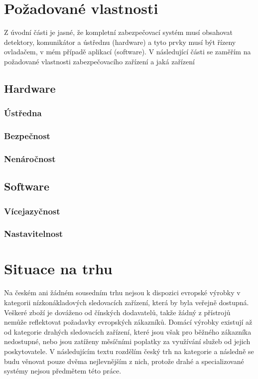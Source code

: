 \documentclass[FM,MP]{tulthesis}  %
\begin{document}

\chapter{Požadované vlastnosti}
Z úvodní části je jasné, že kompletní zabezpečovací systém musí obsahovat detektory, komunikátor a ústřednu (hardware) a tyto prvky musí být řízeny ovladačem, v mém případě aplikací (software). V následující části se zaměřím na požadované vlastnosti zabezpečovacího zařízení a jaká zařízení 

\section{Hardware}

\subsection{Ústředna}


\subsection{Bezpečnost}


\subsection{Nenáročnost}


\section{Software}


\subsection{Vícejazyčnost}


\subsection{Nastavitelnost}



\chapter{Situace na trhu}
Na českém ani žádném sousedním trhu nejsou k dispozici evropské výrobky v kategorii nízkonákladových sledovacích zařízení, která by byla veřejně dostupná. Veškeré zboží je dováženo od čínských dodavatelů, takže žádný z přístrojů nemůže reflektovat požadavky evropských zákazníků. Domácí výrobky existují až od kategorie drahých sledovacích zařízení, které jsou však pro běžného zákazníka nedostupné, nebo jsou zatíženy měsíčními poplatky za využívání služeb od jejich poskytovatele. V následujícím textu rozdělím český trh na kategorie a následně se budu věnovat pouze dvěma nejlevnějším z nich, protože drahé a specializované systémy nejsou předmětem této práce.
\end{document}
